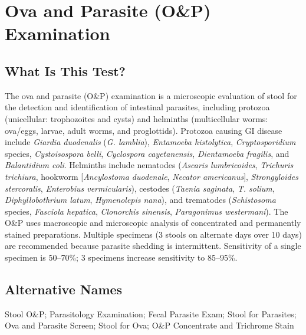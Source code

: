 \chapter{Ova and Parasite (O\&P) Examination}

\section*{What Is This Test?}
The ova and parasite (O\&P) examination is a microscopic evaluation of stool for the detection and identification of intestinal parasites, including protozoa (unicellular: trophozoites and cysts) and helminths (multicellular worms: ova/eggs, larvae, adult worms, and proglottids). Protozoa causing GI disease include \textit{Giardia duodenalis} (\textit{G. lamblia}), \textit{Entamoeba histolytica}, \textit{Cryptosporidium} species, \textit{Cystoisospora belli}, \textit{Cyclospora cayetanensis}, \textit{Dientamoeba fragilis}, and \textit{Balantidium coli}. Helminths include nematodes (\textit{Ascaris lumbricoides}, \textit{Trichuris trichiura}, hookworm [\textit{Ancylostoma duodenale}, \textit{Necator americanus}], \textit{Strongyloides stercoralis}, \textit{Enterobius vermicularis}), cestodes (\textit{Taenia saginata}, \textit{T. solium}, \textit{Diphyllobothrium latum}, \textit{Hymenolepis nana}), and trematodes (\textit{Schistosoma} species, \textit{Fasciola hepatica}, \textit{Clonorchis sinensis}, \textit{Paragonimus westermani}). The O\&P uses macroscopic and microscopic analysis of concentrated and permanently stained preparations. Multiple specimens (3 stools on alternate days over 10 days) are recommended because parasite shedding is intermittent. Sensitivity of a single specimen is 50--70\%; 3 specimens increase sensitivity to 85--95\%.

\section*{Alternative Names}
Stool O\&P; Parasitology Examination; Fecal Parasite Exam; Stool for Parasites; Ova and Parasite Screen; Stool for Ova; O\&P Concentrate and Trichrome Stain


